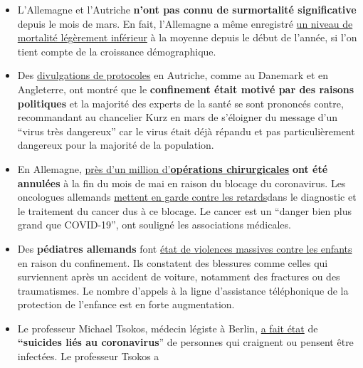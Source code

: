 \begin{itemize}
\tightlist
\item
  L'Allemagne et l'Autriche \textbf{n'ont pas connu de surmortalité
  significative} depuis le mois de mars. En fait, l'Allemagne a même
  enregistré
  \href{https://swprs.files.wordpress.com/2020/06/breyer-deutschland-untersterblichkeit.pdf}{un
  niveau de mortalité légèrement inférieur} à la moyenne depuis le début
  de l'année, si l'on tient compte de la croissance démographique.
\item
  Des
  \href{https://www.falter.at/zeitung/20200512/was-passiert-wenn-es-eng-wird}{divulgations
  de protocoles} en Autriche, comme au Danemark et en Angleterre, ont
  montré que le \textbf{confinement était motivé par des raisons
  politiques} et la majorité des experts de la santé se sont prononcés
  contre, recommandant au chancelier Kurz en mars de s'éloigner du
  message d'un ``virus très dangereux'' car le virus était déjà répandu
  et pas particulièrement dangereux pour la majorité de la population.
\item
  En Allemagne,
  \href{https://www.welt.de/wirtschaft/article208557665/Wegen-Corona-In-Deutschland-wurden-908-000-OPs-aufgeschoben.html}{près
  d'un million d'\textbf{opérations chirurgicales}} \textbf{ont été
  annulées} à la fin du mois de mai en raison du blocage du coronavirus.
  Les oncologues allemands
  \href{https://deutsch.medscape.com/artikelansicht/4908889}{mettent en
  garde contre les retards}dans le diagnostic et le traitement du cancer
  dus à ce blocage. Le cancer est un ``danger bien plus grand que
  COVID-19'', ont souligné les associations médicales.
\item
  Des \textbf{pédiatres allemands} font
  \href{https://www.tagesspiegel.de/politik/knochenbrueche-oder-schuetteltraumata-mediziner-berichten-von-massiver-gewalt-gegen-kinder/25833740.html}{état
  de violences massives contre les enfants} en raison du confinement.
  Ils constatent des blessures comme celles qui surviennent après un
  accident de voiture, notamment des fractures ou des traumatismes. Le
  nombre d'appels à la ligne d'assistance téléphonique de la protection
  de l'enfance est en forte augmentation.
\item
  Le professeur Michael Tsokos, médecin légiste à Berlin,
  \href{https://www.bz-berlin.de/berlin/michael-tsokos-berlins-bekanntester-gerichtsmediziner-spricht-von-corona-suiziden-durch-panikmache}{a
  fait état} de \textbf{``suicides liés au coronavirus}'' de personnes
  qui craignent ou pensent être infectées. Le professeur Tsokos a

\end{itemize}
